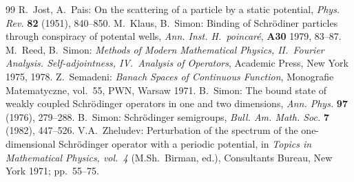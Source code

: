 \documentclass{article}
\numberwithin{equation}{section}
\theoremstyle{definition}
\begin{document}
\begin{thebibliography}{99}
R.~Jost, A.~Pais: On the scattering of a particle by a static potential, \emph{Phys. Rev.} \textbf{82} (1951), 840--850.
M.~Klaus, B.~Simon: Binding of Schr\"odiner particles through conspiracy of potental wells, \emph{Ann. Inst. H.~poincar\'{e}}, \textbf{A30} {1979}, 83--87.
M.~Reed, B.~Simon: \emph{Methods of Modern Mathematical Physics, II.~Fourier Analysis. Self-adjointness, IV.~Analysis of Operators}, Academic Press, New York 1975, 1978.
Z.~Semadeni: \emph{Banach Spaces of Continuous Function}, Monografie Matematyczne, vol.~55, PWN, Warsaw 1971.
B.~Simon: The bound state of weakly coupled Schr\"odinger ope\-rators in one and two dimensions, \emph{Ann. Phys.} \textbf{97} (1976), 279--288.
B.~Simon: Schr\"odinger semigroups, \emph{Bull. Am. Math. Soc.} \textbf{7} (1982), 447--526.
V.A.~Zheludev: Perturbation of the spectrum of the one-dimensional Schr\"odinger operator with a periodic potential, in
\emph{Topics in Mathematical Physics, vol.~4} (M.Sh.~Birman, ed.), Consultants Bureau, New York 1971; pp.~55--75.
\end{thebibliography}
\end{document}
